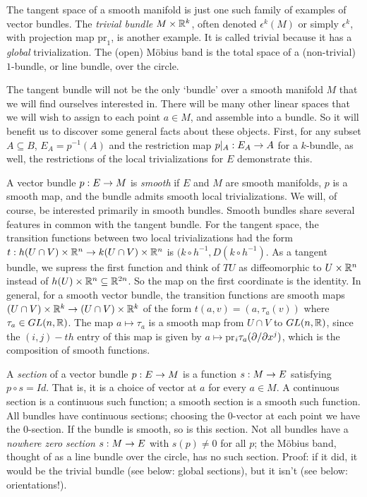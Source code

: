 The tangent space of a smooth manifold
is just one such family of examples of vector bundles. 
The {\it trivial bundle}
$M\times {\Bbb R}^k$, often denoted $\epsilon^k(M)$ or simply $\epsilon^k$,
with projection map $\text{pr}_1$, is another example. 
It is called trivial because it has a {\it global} trivialization. The (open)
M\"obius band is the total space of a (non-trivial) $1$-bundle, or line bundle, over the circle.

The tangent bundle will not be the only `bundle' over a smooth manifold
$M$ that we will find ourselves interested in. There will be many other linear spaces that we
will wish to assign to each point $a\in M$, and assemble into a bundle. So it will benefit
us to discover some general facts about these objects. First, for any subset
$A\subseteq B$, $E_A=p^{-1}(A)$ and the restriction map $p|_A:E_A\rightarrow A$ for a $k$-bundle,
as well, the restrictions of the local trivializations for $E$ demonstrate this.

A vector bundle $p:E\rightarrow M$ is {\it smooth} if $E$ and $M$ are smooth manifolds, $p$
is a smooth map, and the bundle admits smooth local trivializations. We will, of course, 
be interested primarily in smooth bundles. Smooth bundles share several features in common
with the tangent bundle. For the tangent space, the transition functions between two
local trivializations had the form 
$t:h(U\cap V)\times {\Bbb R}^n\rightarrow k(U\cap V)\times {\Bbb R}^n$ is $(k\circ h^{-1},D(k\circ h^{-1})$.
As a tangent bundle, we supress the first function and think of $TU$ as diffeomorphic to
$U\times {\Bbb R}^n$ instead of $h(U)\times {\Bbb R}^n\subseteq {\Bbb R}^{2n}$. So the map on the first coordinate
is the identity.
In general, for a smooth vector bundle, the transition functions are smooth maps
$(U\cap V)\times {\Bbb R}^k\rightarrow(U\cap V)\times {\Bbb R}^k$ of the form $t(a,v)=(a,\tau_a(v))$
where $\tau_a\in GL(n,{\Bbb R})$. The map $a\mapsto \tau_a$ is a smooth map from 
$U\cap V$ to $GL(n,{\Bbb R})$, since the $(i,j)-th$ entry of this map is given by
$a\mapsto$pr$_i \tau_a(\partial/\partial x^j)$, which is the composition of smooth functions.

\msk

A {\it section} of a vector bundle $p:E\rightarrow M$ is a function $s:M\rightarrow E$ satisfying $p\circ s=Id$.
That is, it is a choice of vector at $a$ for every $a\in M$. A continuous section is a 
continuous such function; a smooth section is a smooth such function. All bundles have 
continuous sections; choosing the $0$-vector at each point we have the $0$-section. If 
the bundle is smooth, so is this section. Not all bundles have a {\it nowhere zero section}
$s:M\rightarrow E$ with $s(p)\neq 0$ for all $p$; the M\"obius band, thought of as a line bundle
over the circle, has no such section. Proof: if it did, it would be the trivial bundle
(see below: global sections), but it isn't (see below: orientations!). 

